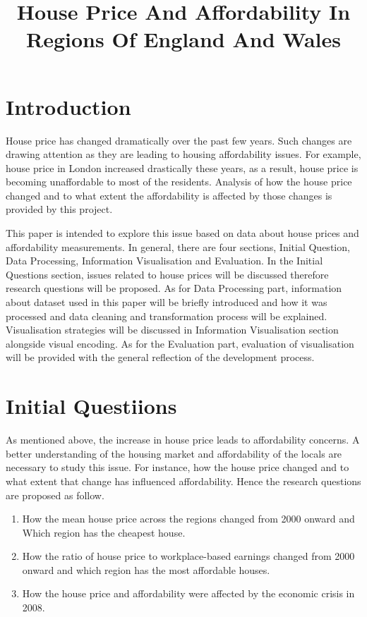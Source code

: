 \documentclass{article}
\title{House Price And Affordability In Regions Of England And Wales}
\begin{document}
%
\maketitle
%

\section{Introduction}
House price has changed dramatically over the past few years. Such changes are drawing attention as they are leading to housing affordability issues. For example, house price in London increased drastically these years, as a result, house price is becoming unaffordable
to most of the residents. Analysis of how the house price changed and to what extent the affordability is affected by those changes is provided by this project.

This paper is intended to explore this issue based on data about house prices and affordability measurements. 
In general, there are four sections, Initial Question, Data Processing, Information Visualisation and Evaluation.
In the Initial Questions section, issues related to house prices will be discussed therefore research questions will be proposed. As for Data Processing part, information about dataset used in this paper will be briefly introduced and how it was processed and data cleaning and transformation process will be explained. 
Visualisation strategies will be discussed in Information Visualisation section alongside visual encoding. 
As for the Evaluation part, evaluation of visualisation will be provided with the general reflection of the development process.

\section{Initial Questiions}
As mentioned above, the increase in house price leads to affordability concerns. A better understanding of the housing market and affordability of the locals are necessary to study this issue. For instance, 
how the house price changed and to what extent that change has influenced affordability. Hence the research questions are proposed as follow.

\begin{enumerate}
  \item How the mean house price across the regions changed from 2000 onward and Which region has the cheapest house.
  \item How the ratio of house price to workplace-based earnings changed from 2000 onward and which region has the most affordable houses.
  \item How the house price and affordability were affected by the economic crisis in 2008.
\end{enumerate}
\end{document}
